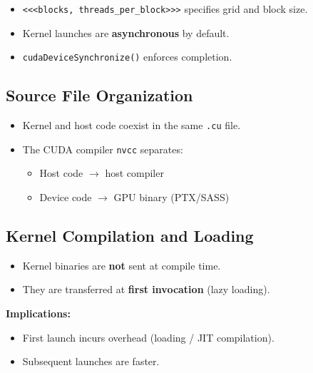 \begin{ppnote}
\begin{itemize}
    \item \verb|<<<blocks, threads_per_block>>>| specifies grid and block size.
    \item Kernel launches are \textbf{asynchronous} by default.
    \item \verb|cudaDeviceSynchronize()| enforces completion.
\end{itemize}
\end{ppnote}

\subsection{Source File Organization}

\begin{ppnote}
\begin{itemize}
    \item Kernel and host code coexist in the same \verb|.cu| file.
    \item The CUDA compiler \texttt{nvcc} separates:
    \begin{itemize}
        \item Host code $\rightarrow$ host compiler
        \item Device code $\rightarrow$ GPU binary (PTX/SASS)
    \end{itemize}
\end{itemize}
\end{ppnote}

\subsection{Kernel Compilation and Loading}

\begin{ppnote}
\begin{itemize}
    \item Kernel binaries are \textbf{not} sent at compile time.
    \item They are transferred at \textbf{first invocation} (lazy loading).
\end{itemize}
\end{ppnote}

\begin{ppnote}
\textbf{Implications:}
\begin{itemize}
    \item First launch incurs overhead (loading / JIT compilation).
    \item Subsequent launches are faster.
\end{itemize}
\end{ppnote}

